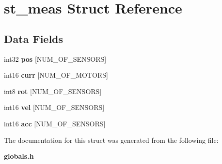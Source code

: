 \section{st\+\_\+meas Struct Reference}
\label{structst__meas}
\subsection*{Data Fields}
\begin{DoxyCompactItemize}
\item 
\mbox{\label{structst__meas_a3ee4913e7257d25d3e47cbbada9c8546}} 
int32 {\bfseries pos} [N\+U\+M\+\_\+\+O\+F\+\_\+\+S\+E\+N\+S\+O\+RS]
\item 
\mbox{\label{structst__meas_aec90a36a08ebccee4e4a476d2c6e82a5}} 
int16 {\bfseries curr} [N\+U\+M\+\_\+\+O\+F\+\_\+\+M\+O\+T\+O\+RS]
\item 
\mbox{\label{structst__meas_a26b47db1884c475bc42d76a709349f97}} 
int8 {\bfseries rot} [N\+U\+M\+\_\+\+O\+F\+\_\+\+S\+E\+N\+S\+O\+RS]
\item 
\mbox{\label{structst__meas_ad77c8d1a6800fe7da9ebed5c54a1e3b5}} 
int16 {\bfseries vel} [N\+U\+M\+\_\+\+O\+F\+\_\+\+S\+E\+N\+S\+O\+RS]
\item 
\mbox{\label{structst__meas_a3748adf2edf02ab9e3cd7f4fc5b0d2e6}} 
int16 {\bfseries acc} [N\+U\+M\+\_\+\+O\+F\+\_\+\+S\+E\+N\+S\+O\+RS]
\end{DoxyCompactItemize}


The documentation for this struct was generated from the following file\+:\begin{DoxyCompactItemize}
\item 
\textbf{ globals.\+h}\end{DoxyCompactItemize}

